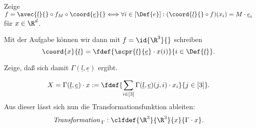 \documentclass[../WiSe22ANA3.tex]{subfiles}
\begin{document}
		\begin{Aufgabe}
			\nr\label{afg:coordf} Zeige $f=\avec{\underline l}{}\circ f_M\circ\coord{\underline e}{}\Longleftrightarrow\forall i\in[\Def{e}]:(\coord{\underline l}{}\circ f)(x_i)=M\cdot\underline e_i$ für $x\in\R^d$. 
		\end{Aufgabe}
		\noindent Mit der Aufgabe  können wir dann mit $f=\id{\R^3}{}$ schreiben 
		$$\coord{x}{\underline l}=\fdef{\scpr{\underline l}{\underline e}\cdot x(i)}{i\in\Def{\underline l}}.$$
		\begin{Aufgabe}
			\nr Zeige, daß sich damit $\Gamma(\underline l,\underline e)$ ergibt. 
		\end{Aufgabe}
		\begin{align*}
			X=\Gamma(\underline l,\underline e)\cdot x:=\fdef{\sum_{i\in[3]}\Gamma(\underline l,\underline e)(j,i)\cdot x_i}{j\in[3]}.
		\end{align*}
		Aus dieser lässt sich nun die Transformationsfunktion ableiten:
		\begin{align*}
			\textit{Transformation\,}_\Gamma:\clfdef{\R^3}{\R^3}{x}{\Gamma\cdot x}.
		\end{align*}
\end{document}
